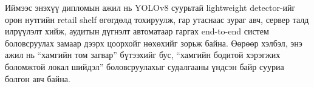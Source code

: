 Иймээс энэхүү дипломын ажил нь YOLOv8 суурьтай lightweight detector-ийг орон нутгийн retail shelf өгөгдөлд тохируулж, гар утаснаас зураг авч, сервер талд илрүүлэлт хийж, аудитын дүгнэлт автоматаар гаргах end-to-end систем боловсруулах замаар дээрх цоорхойг нөхөхийг зорьж байна. Өөрөөр хэлбэл, энэ ажил нь ``хамгийн том загвар'' бүтээхийг бус, ``хамгийн бодитой хэрэгжих боломжтой локал шийдэл'' боловсруулахыг судалгааны үндсэн байр сууриа болгон авч байна.
